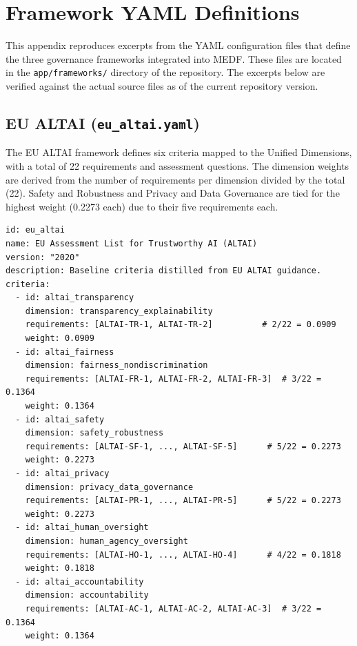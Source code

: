 \chapter{Framework YAML Definitions}
\label{app:yaml}

This appendix reproduces excerpts from the YAML configuration files that define the three governance frameworks integrated into MEDF. These files are located in the \texttt{app/frameworks/} directory of the repository. The excerpts below are verified against the actual source files as of the current repository version.

\section{EU ALTAI (\texttt{eu\_altai.yaml})}

The EU ALTAI framework defines six criteria mapped to the Unified Dimensions, with a total of 22 requirements and assessment questions. The dimension weights are derived from the number of requirements per dimension divided by the total (22). Safety and Robustness and Privacy and Data Governance are tied for the highest weight (0.2273 each) due to their five requirements each.

\begin{lstlisting}[language={}, caption={EU ALTAI Section-Count Weights: derived from requirement counts per dimension.}]
id: eu_altai
name: EU Assessment List for Trustworthy AI (ALTAI)
version: "2020"
description: Baseline criteria distilled from EU ALTAI guidance.
criteria:
  - id: altai_transparency
    dimension: transparency_explainability
    requirements: [ALTAI-TR-1, ALTAI-TR-2]          # 2/22 = 0.0909
    weight: 0.0909
  - id: altai_fairness
    dimension: fairness_nondiscrimination
    requirements: [ALTAI-FR-1, ALTAI-FR-2, ALTAI-FR-3]  # 3/22 = 0.1364
    weight: 0.1364
  - id: altai_safety
    dimension: safety_robustness
    requirements: [ALTAI-SF-1, ..., ALTAI-SF-5]      # 5/22 = 0.2273
    weight: 0.2273
  - id: altai_privacy
    dimension: privacy_data_governance
    requirements: [ALTAI-PR-1, ..., ALTAI-PR-5]      # 5/22 = 0.2273
    weight: 0.2273
  - id: altai_human_oversight
    dimension: human_agency_oversight
    requirements: [ALTAI-HO-1, ..., ALTAI-HO-4]      # 4/22 = 0.1818
    weight: 0.1818
  - id: altai_accountability
    dimension: accountability
    requirements: [ALTAI-AC-1, ALTAI-AC-2, ALTAI-AC-3]  # 3/22 = 0.1364
    weight: 0.1364
\end{lstlisting}

